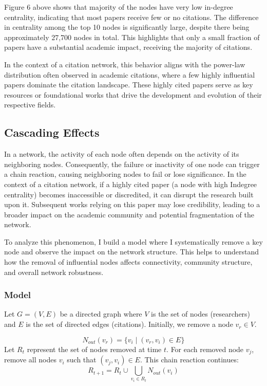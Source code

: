 \documentclass{article}
\begin{document}
Figure 6 above shows that majority of the nodes have very low in-degree centrality, indicating that most papers receive few or no citations. The difference in centrality among the top 10 nodes is significantly large, despite there being approximately 27,700 nodes in total. This highlights that only a small fraction of papers have a substantial academic impact, receiving the majority of citations.

In the context of a citation network, this behavior aligns with the power-law distribution often observed in academic citations, where a few highly influential papers dominate the citation landscape. These highly cited papers serve as key resources or foundational works that drive the development and evolution of their respective fields.

\subsection{Cascading Effects}
 In a network, the activity of each node often depends on the activity of its neighboring nodes. Consequently, the failure or inactivity of one node can trigger a chain reaction, causing neighboring nodes to fail or lose significance. In the context of a citation network, if a highly cited paper (a node with high Indegree centrality) becomes inaccessible or discredited, it can disrupt the research built upon it. Subsequent works relying on this paper may lose credibility, leading to a broader impact on the academic community and potential fragmentation of the network.  

To analyze this phenomenon, I build a model where I systematically remove a key node and observe the impact on the network structure. This helps to understand how the removal of influential nodes affects connectivity, community structure, and overall network robustness.

\subsubsection{Model}
Let \( G = (V, E) \) be a directed graph where \( V \) is the set of nodes (researchers) and \( E \) is the set of directed edges (citations). Initially, we remove a node \( v_r \in V \).

\[
N_{out}(v_r) = \{ v_i \mid (v_r, v_i) \in E \}
\]
Let \( R_t \) represent the set of nodes removed at time \( t \). For each removed node \( v_j \), remove all nodes \( v_i \) such that \( (v_j, v_i) \in E \). This chain reaction continues:
\[
R_{t+1} = R_t \cup \bigcup_{v_i \in R_t} N_{out}(v_i)
\]
\end{document}
